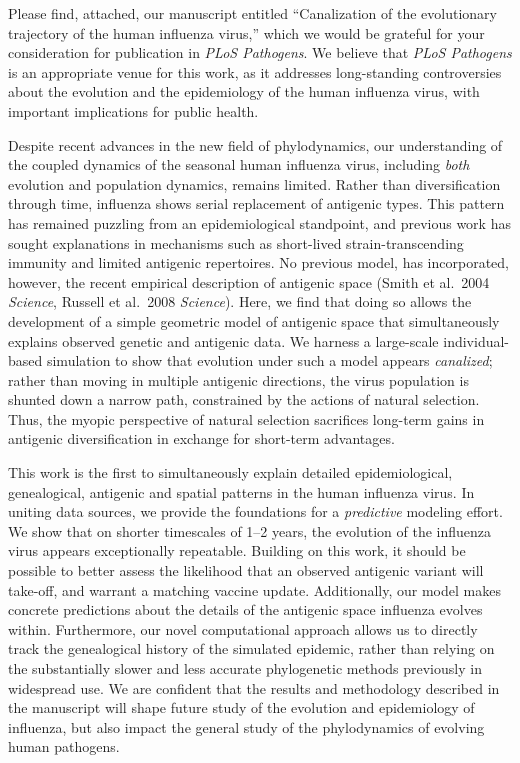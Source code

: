 \documentclass[stdletter,letterpaper,addrfromright,orderfromdateto,dateleft,11pt,noaddrto,sigleft]{newlfm}
\begin{document}
\begin{newlfm}

Please find, attached, our manuscript entitled ``Canalization of the evolutionary trajectory of the human influenza virus,'' which we would be grateful for your consideration for publication in \textit{PLoS Pathogens}.  We believe that \textit{PLoS Pathogens} is an appropriate venue for this work, as it addresses long-standing controversies about the evolution and the epidemiology of the human influenza virus, with important implications for public health.

Despite recent advances in the new field of phylodynamics, our understanding of the coupled dynamics of the seasonal human influenza virus, including \textit{both} evolution and population dynamics, remains limited.  Rather than diversification through time, influenza shows serial replacement of antigenic types.  This pattern has remained puzzling from an epidemiological standpoint, and previous work has sought explanations in mechanisms such as short-lived strain-transcending immunity and limited antigenic repertoires.  No previous model, has incorporated, however, the recent empirical description of antigenic space (Smith et al.\ 2004 \textit{Science}, Russell et al.\ 2008 \textit{Science}).  Here, we find that doing so allows the development of a simple geometric model of antigenic space that simultaneously explains observed genetic and antigenic data.  We harness a large-scale individual-based simulation to show that evolution under such a model appears \textit{canalized}; rather than moving in multiple antigenic directions, the virus population is shunted down a narrow path, constrained by the actions of natural selection.  Thus, the myopic perspective of natural selection sacrifices long-term gains in antigenic diversification in exchange for short-term advantages.

This work is the first to simultaneously explain detailed epidemiological, genealogical, antigenic and spatial patterns in the human influenza virus.  In uniting data sources, we provide the foundations for a \textit{predictive} modeling effort.  We show that on shorter timescales of 1--2 years, the evolution of the influenza virus appears exceptionally repeatable.  Building on this work, it should be possible to better assess the likelihood that an observed antigenic variant will take-off, and warrant a matching vaccine update.  Additionally, our model makes concrete predictions about the details of the antigenic space influenza evolves within.  Furthermore, our novel computational approach allows us to directly track the genealogical history of the simulated epidemic, rather than relying on the substantially slower and less accurate phylogenetic methods previously in widespread use.  We are confident that the results and methodology described in the manuscript will shape future study of the evolution and epidemiology of influenza, but also impact the general study of the phylodynamics of evolving human pathogens.

\end{newlfm}
\end{document}
